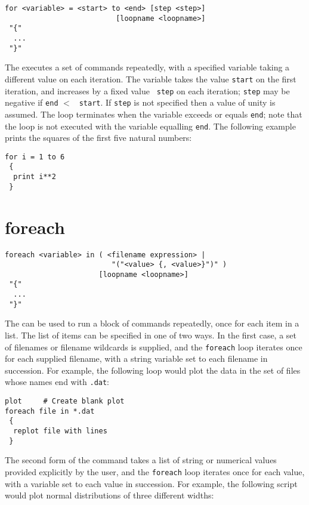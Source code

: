 \begin{verbatim}
for <variable> = <start> to <end> [step <step>]
                          [loopname <loopname>]
 "{"
  ...
 "}"
\end{verbatim}

The  executes a set of commands repeatedly, with a specified
variable taking a different value on each iteration. The variable takes the
value {\tt start} on the first iteration, and increases by a fixed value {\tt
step} on each iteration; {\tt step} may be negative if {\tt end} $<$ {\tt
start}. If {\tt step} is not specified then a value of unity is assumed. The
loop terminates when the variable exceeds or equals {\tt end}; note that the
loop is not executed with the variable equalling {\tt end}.  The following
example prints the squares of the first five natural numbers:

\begin{verbatim}
for i = 1 to 6
 {
  print i**2
 }
\end{verbatim}


\section{foreach}

\begin{verbatim}
foreach <variable> in ( <filename expression> |
                         "("<value> {, <value>}")" )
                      [loopname <loopname>]
 "{"
  ...
 "}"
\end{verbatim}

The  can be used to run a block of commands repeatedly, once
for each item in a list.  The list of items can be specified in one of two
ways.  In the first case, a set of filenames or filename wildcards is supplied,
and the {\tt foreach} loop iterates once for each supplied filename, with a
string variable set to each filename in succession.  For example, the following
loop would plot the data in the set of files whose names end with {\tt .dat}:

\begin{verbatim}
plot     # Create blank plot
foreach file in *.dat
 {
  replot file with lines
 }
\end{verbatim}

The second form of the command takes a list of string or numerical values
provided explicitly by the user, and the {\tt foreach} loop iterates once for
each value, with a variable set to each value in succession.  For example, the
following script would plot normal distributions of three different widths:

